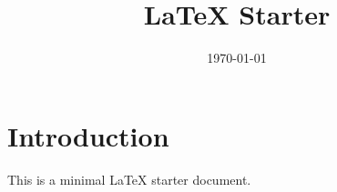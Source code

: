 \documentclass[11pt]{article}
\title{LaTeX Starter}
\author{}
\date{\today}
\begin{document}
\maketitle

\section{Introduction}
This is a minimal LaTeX starter document.
\end{document}

